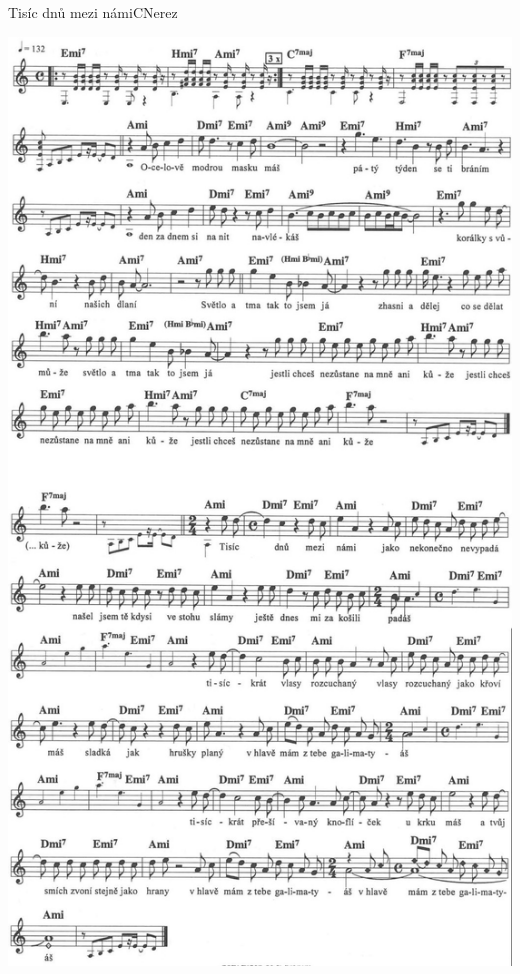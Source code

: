 \setcounter{page}{87}
\begin{song}{Tisíc dnů mezi námi}{C}{Nerez}
\begin{center}
\includegraphics[height=0.9\textheight]{noty/a_tisíc-dnů-mezi-námi} 
\end{center}
\end{song} \pagebreak

